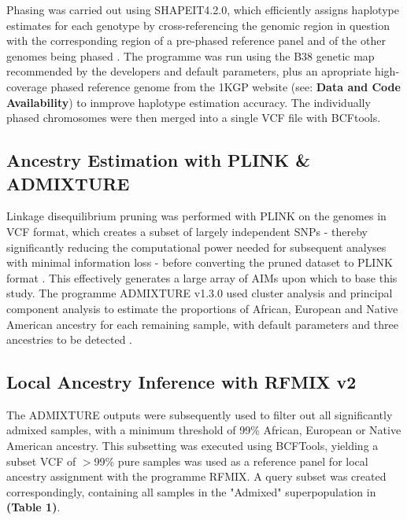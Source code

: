 \documentclass[11pt]{article}
\begin{document}
Phasing was carried out using SHAPEIT4.2.0, which efficiently assigns haplotype estimates for each genotype by cross-referencing the genomic region in question with the corresponding region of a pre-phased reference panel and of the other genomes being phased \parencite{Delaneau2019}. The programme was run using the B38 genetic map recommended by the developers and default parameters, plus an apropriate high-coverage phased reference genome from the 1KGP website (see: \textbf{Data and Code Availability}) to inmprove haplotype estimation accuracy. The individually phased chromosomes were then merged into a single VCF file with BCFtools. 





\subsection{Ancestry Estimation with PLINK \& ADMIXTURE}


Linkage disequilibrium pruning was performed with PLINK on the genomes in VCF format, which creates a subset of largely independent SNPs - thereby significantly reducing the computational power needed for subsequent analyses with minimal information loss - before converting the pruned dataset to PLINK format \parencite{Purcell2007}. This effectively generates a large array of AIMs upon which to base this study.
The programme ADMIXTURE v1.3.0 used cluster analysis and principal component analysis to estimate the proportions of African, European and Native American ancestry for each remaining sample, with default parameters and three ancestries to be detected \parencite{Alexander2009}.





\subsection{Local Ancestry Inference with RFMIX v2}


The ADMIXTURE outputs were subsequently used to filter out all significantly admixed samples, with a minimum threshold of 99\% African, European or Native American ancestry. This subsetting was executed using BCFTools, yielding a subset VCF of $>$99\% pure samples was used as a reference panel for local ancestry assignment with the programme RFMIX. A query subset was created correspondingly, containing all samples in the "Admixed" superpopulation in \textbf{(Table 1)}.
\end{document}
